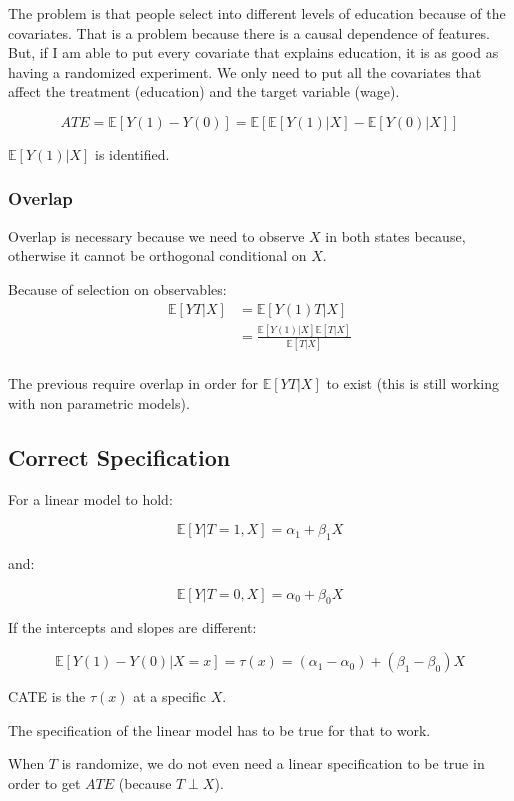 \documentclass{article}
\begin{document}
The problem is that people select into different levels of education because of the covariates. That is a problem because there is a causal dependence of features. But, if I am able to put every covariate that explains education, it is as good as having a randomized experiment. We only need to put all the covariates that affect the treatment (education) and the target variable (wage).

$$
ATE = \mathbb{E}[Y(1) - Y(0)] = \mathbb{E}[\mathbb{E}[Y(1) | X] - \mathbb{E}[Y(0) | X]]
$$

$\mathbb{E}[Y(1) | X]$ is identified.

\subsubsection{Overlap}

Overlap is necessary because we need to observe $X$ in both states because, otherwise it cannot be orthogonal conditional on $X$.

Because of selection on observables:
\begin{align*}
    \mathbb{E}[YT | X] &= \mathbb{E}[Y(1)T | X] \\
                       &= \frac{\mathbb{E}[Y(1) | X] \mathbb{E}[T | X]}{\mathbb{E}[T | X]} \\
\end{align*}

The previous require overlap in order for $\mathbb{E}[YT | X]$ to exist (this is still working with non parametric models).

\subsection{Correct Specification}

For a linear model to hold:

$$
\mathbb{E}[Y | T = 1, X] = \alpha_1 + \beta_1 X
$$

and:

$$
\mathbb{E}[Y | T = 0, X] = \alpha_0 + \beta_0 X
$$

If the intercepts and slopes are different:

$$
\mathbb{E}[Y(1) - Y(0) | X = x] = \tau(x) = (\alpha_1 - \alpha_0) + (\beta_1 - \beta_0) X
$$

CATE is the $\tau(x)$ at a specific $X$.

The specification of the linear model has to be true for that to work.

When $T$ is randomize, we do not even need a linear specification to be true in order to get $ATE$ (because $T \perp X$).
\end{document}
